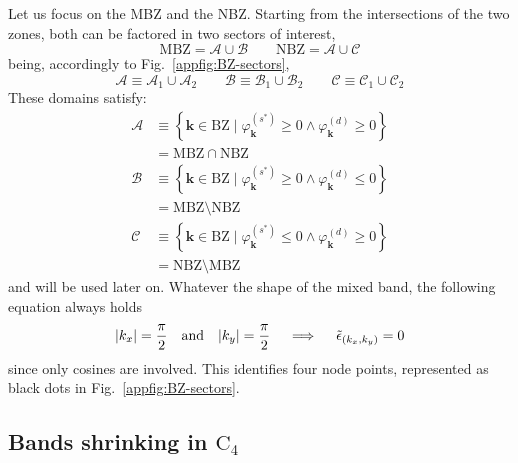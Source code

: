 Let us focus on the MBZ and the NBZ. Starting from the intersections of the two zones, both can be factored in two sectors of interest,
\[
\mathrm{MBZ} = \mathcal{A} \cup \mathcal{B}
\qquad
\mathrm{NBZ} = \mathcal{A} \cup \mathcal{C}
\]
being, accordingly to Fig.~\ref{appfig:BZ-sectors},
\[
\mathcal{A} \equiv \mathcal{A}_1 \cup \mathcal{A}_2
\qquad
\mathcal{B} \equiv \mathcal{B}_1 \cup \mathcal{B}_2
\qquad
\mathcal{C} \equiv \mathcal{C}_1 \cup \mathcal{C}_2
\]
These domains satisfy:
\begin{align}
	\mathcal{A} &\equiv \left\lbrace
	\mathbf{k}\in\mathrm{BZ}
	\mid 
	\varphi_\mathbf{k}^{(s^*)} \ge 0 \land 	\varphi_\mathbf{k}^{(d)} \ge 0
	\right\rbrace \label{appeq:BZ-A-def} \\
	&= \mathrm{MBZ} \cap \mathrm{NBZ} \nonumber\\[0.5em]
	\mathcal{B} &\equiv \left\lbrace
	\mathbf{k}\in\mathrm{BZ}
	\mid 
	\varphi_\mathbf{k}^{(s^*)} \ge 0 \land 	\varphi_\mathbf{k}^{(d)} \le 0
	\right\rbrace \label{appeq:BZ-B-def} \\
	&= \mathrm{MBZ} \setminus \mathrm{NBZ} \nonumber\\[0.5em]
	\mathcal{C} &\equiv \left\lbrace
	\mathbf{k}\in\mathrm{BZ}
	\mid 
	\varphi_\mathbf{k}^{(s^*)} \le 0 \land 	\varphi_\mathbf{k}^{(d)} \ge 0
	\right\rbrace \label{appeq:BZ-C-def} \\
	&= \mathrm{NBZ} \setminus \mathrm{MBZ} \nonumber
\end{align}
and will be used later on. Whatever the shape of the mixed band, the following equation always holds
\[
\abs{k_x} = \frac{\pi}{2} \qq{and} \abs{k_y} = \frac{\pi}{2}
\quad\implies\quad
\tilde{\epsilon}_{(k_x,k_y)} = 0
\]
since only cosines are involved. This identifies four node points, represented as black dots in Fig.~\ref{appfig:BZ-sectors}.

\subsection{Bands shrinking in $\mathrm{C}_4$}\label{appsubsec:normal-bands-shrinking}

